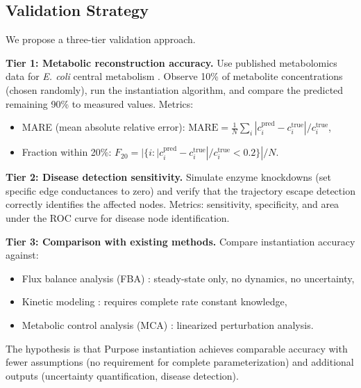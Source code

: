 \documentclass[twocolumn,10pt,a4paper]{article}
\theoremstyle{definition}
\theoremstyle{remark}
\begin{document}
\subsection{Validation Strategy}

We propose a three-tier validation approach.

\textbf{Tier 1: Metabolic reconstruction accuracy.} Use published metabolomics data for \emph{E. coli} central metabolism \citep{Palsson2006}. Observe 10\% of metabolite concentrations (chosen randomly), run the instantiation algorithm, and compare the predicted remaining 90\% to measured values. Metrics:
\begin{itemize}[nosep]
    \item MARE (mean absolute relative error): $\mathrm{MARE} = \frac{1}{N} \sum_i |c_i^{\mathrm{pred}} - c_i^{\mathrm{true}}| / c_i^{\mathrm{true}}$,
    \item Fraction within 20\%: $F_{20} = |\{i : |c_i^{\mathrm{pred}} - c_i^{\mathrm{true}}|/c_i^{\mathrm{true}} < 0.2\}| / N$.
\end{itemize}

\textbf{Tier 2: Disease detection sensitivity.} Simulate enzyme knockdowns (set specific edge conductances to zero) and verify that the trajectory escape detection correctly identifies the affected nodes. Metrics: sensitivity, specificity, and area under the ROC curve for disease node identification.

\textbf{Tier 3: Comparison with existing methods.} Compare instantiation accuracy against:
\begin{itemize}[nosep]
    \item Flux balance analysis (FBA) \citep{Orth2010}: steady-state only, no dynamics, no uncertainty,
    \item Kinetic modeling \citep{vanKampen2007}: requires complete rate constant knowledge,
    \item Metabolic control analysis (MCA) \citep{Fell1992}: linearized perturbation analysis.
\end{itemize}
The hypothesis is that Purpose instantiation achieves comparable accuracy with fewer assumptions (no requirement for complete parameterization) and additional outputs (uncertainty quantification, disease detection).
\end{document}
